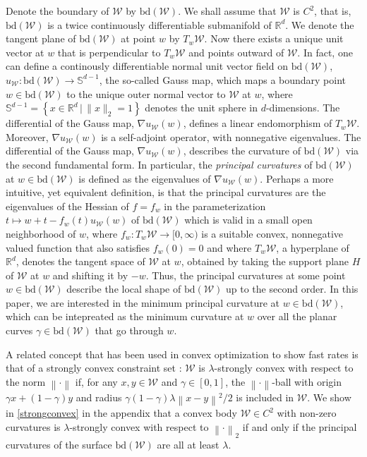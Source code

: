 \documentclass[english]{article}
\newcommand{\cW}{\mathcal{W}}
\newcommand{\R}{\mathbb{R}}
\newcommand{\bS}{\mathbb{S}}
\newcommand{\set}[2]{\left\{#1 \,\vert\, #2 \right\}}
\newcommand{\norm}[1]{\left\| #1 \right\|}
\newcommand{\bd}{\mathrm{bd}}
\begin{document}
Denote the boundary of $\cW$ by $\bd(\cW)$.
We shall assume that $\cW$ is $C^2$, that is, $\bd(\cW)$ is a twice continuously differentiable submanifold
of $\R^d$. 
We denote the tangent plane of $\bd(\cW)$ at point $w$ by $T_w\cW$. Now there exists a unique unit vector at $w$ that is perpendicular to $T_w\cW$ and points outward of $\cW$.
In fact, one can define a continously differentiable normal unit vector field on $\bd(\cW)$, $u_{\cW}: \bd(\cW) \to \bS^{d-1}$, the so-called Gauss map, which maps a boundary point $w\in \bd(\cW)$ to the unique outer normal vector to $\cW$ at $w$, where
$\bS^{d-1}=\set{x\in\R^d}{\|x\|_2=1}$ denotes the unit sphere in $d$-dimensions. 
The differential of the Gauss map, $\nabla u_{\cW}(w)$, defines a linear endomorphism of $T_w\cW$. Moreover, $\nabla u_{\cW}(w)$ is a self-adjoint operator, with nonnegative eigenvalues.
The differential of the Gauss map, $\nabla u_{\cW}(w)$, describes the curvature of $\bd(\cW)$ via the second fundamental form. In particular, the \emph{principal curvatures} of $\bd(\cW)$ at $w\in\bd(\cW)$ is defined as the eigenvalues of $\nabla u_{\cW}(w)$.   
Perhaps a more intuitive, yet equivalent definition, is that the principal curvatures are the eigenvalues
of the Hessian of $f=f_w$ in the parameterization $t\mapsto w+t-f_w(t) u_{\cW}(w)$ of $\bd(\cW)$
which is valid in a small open neighborhood of $w$, where $f_w: T_w \cW \to [0,\infty)$ is
a suitable convex, nonnegative valued function that also satisfies $f_w(0)= 0$ and where $T_w \cW$, 
a hyperplane of $\R^d$,
denotes the tangent space of $\cW$ at $w$, 
obtained by taking the support plane $H$ of $\cW$ at $w$ and shifting it by $-w$.
Thus, the principal curvatures at some point $w\in \bd(\cW)$ describe the local shape of $\bd(\cW)$ 
up to the second order. 
In this paper, we are interested in the minimum principal curvature at $w\in\bd(\cW)$, which can be intepreated as the minimum curvature at $w$ over all the planar curves $\gamma \in \bd(\cW)$ that go through $w$.

A related concept that has been used in convex optimization to show fast rates is that of a strongly convex constraint set \citep{LePo66,garber2014faster}:
$\cW$ is $\lambda$-strongly convex with respect to the norm $\norm{\cdot}$ if, for  any $x,y\in \cW$ and $\gamma\in [0,1]$, the $\norm{\cdot}$-ball with origin $\gamma x + (1-\gamma) y$ and radius $\gamma(1-\gamma) \lambda \norm{x-y}^2/2 $ is included in $ \cW$. %
We show in \cref{strongconvex} in the appendix that a convex body
 $\cW \in C^2$ with non-zero curvatures is $\lambda$-strongly convex with respect to $\norm{\cdot}_2$ if and only if the principal curvatures of the surface $\bd(\cW)$ are all at least $\lambda$.
\end{document}
